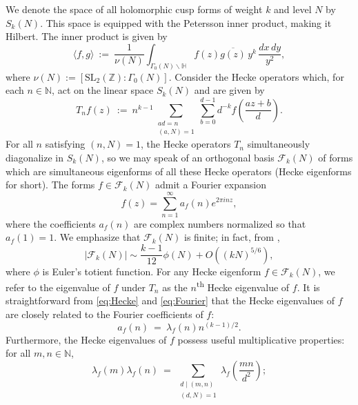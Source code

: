 \documentclass[12pt, reqno,oneside]{amsart}
\theoremstyle{plain}
\theoremstyle{definition}
\theoremstyle{remark}
\theoremstyle{plain}
\numberwithin{equation}{section}
\begin{document}
We denote the space of all holomorphic cusp forms of weight $k$ and level $N$ by $S_k(N)$. This space is equipped with the Petersson inner product, making it Hilbert. The inner product is given by
\begin{equation}\label{eq:Petersson}
\langle f,g\rangle \ := \ \frac{1}{\nu(N)}\int_{\Gamma_0(N) \backslash\mathbb{H}}f(z)\overline{g(z)}\,y^k\,\frac{dx\,dy}{y^2},
\end{equation}
where $\nu(N):=[\mathrm{SL}_2(\mathbb{Z}):\Gamma_0(N)]$. 
Consider the Hecke operators which, for each $n\in \mathbb N$, act on the linear space $S_k(N)$ and are given by
\begin{equation}\label{eq:Hecke}
T_nf(z) \ := \ n^{k-1}\sum_{\substack{ad=n \\(a,N)=1}}\sum_{b=0}^{d-1}d^{-k}f\left(\frac{az+b}{d}\right).  
\end{equation} 
For all $n$ satisfying $(n,N)=1$, the Hecke operators $T_n$ simultaneously diagonalize in $S_k(N)$, so we may speak of an orthogonal basis $\mathcal{F}_k(N)$ of forms which are simultaneous eigenforms of all these Hecke operators (Hecke eigenforms for short). The forms $f\in\mathcal{F}_k(N)$ admit a Fourier expansion
\begin{equation}\label{eq:Fourier}
f(z)=\sum_{n=1}^{\infty}a_f(n)e^{2\pi inz},
\end{equation}
where the coefficients $a_f(n)$ are complex numbers normalized so that $a_f(1)=1$. We emphasize that $\mathcal{F}_k(N)$ is finite; in fact, from \cite[(2.73)]{ILS00},
\begin{equation}
    \left|\mathcal{F}_k(N)\right|\sim\frac{k-1}{12}\phi(N)+O\left((kN)^{5/6}\right),
\end{equation} 
where $\phi$ is Euler's totient function. For any Hecke eigenform $f\in\mathcal{F}_k(N)$, we refer to the eigenvalue of $f$ under $T_n$ as the $n$\textsuperscript{th} Hecke eigenvalue of $f$. It is straightforward from \eqref{eq:Hecke} and \eqref{eq:Fourier} that the Hecke eigenvalues of $f$ are closely related to the Fourier coefficients of $f$: 
\begin{equation}\label{eq:Fourier-Hecke}
    a_f(n) \ = \ \lambda_f(n)n^{(k-1)/2}.
\end{equation}
Furthermore, the Hecke eigenvalues of $f$ possess useful multiplicative properties: for all $m,n\in\mathbb{N}$,
\begin{equation}
\lambda_f(m)\lambda_f(n) \ = \ \sum_{\substack{d\mid(m,n)\\ (d,N)=1}}\lambda_f\left(\frac{mn}{d^2}\right);
\end{equation}
\end{document}
